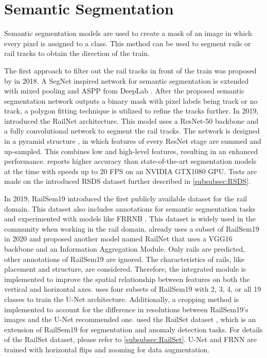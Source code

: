 \section{Semantic Segmentation}
\label{sec:SemanticSegmentation}

Semantic segmentation models are used to create a mask of an image in which every pixel is assigned to a class.
This method can be used to segment rails or rail tracks to obtain the direction of the train.

The first approach to filter out the rail tracks in front of the train was proposed by \cite{firstRailSegmentation2018} in 2018.
A SegNet \cite{SegNet2017} inspired network for semantic segmentation is extended with mixed pooling \cite{mixedPooling2014} and \ac{ASPP} from DeepLab \cite{deepLab2018}.
After the proposed semantic segmentation network outputs a binary mask with pixel labels being track or no track, a polygon fitting technique is utilized to refine the tracks further.
In 2019, \cite{railNet2019} introduced the RailNet architecture.
This model uses a ResNet-50 \cite{ResNet} backbone and a fully convolutional network \cite{FullyConvolutionalNetworks2015} to segment the rail tracks.
The network is designed in a pyramid structure \cite{FPN2017_two_stage-detector}, in which features of every ResNet stage are summed and up-sampled.
This combines low and high-level features, resulting in an enhanced performance.
\cite{railNet2019} reports higher accuracy than state-of-the-art segmentation models at the time with speeds up to 20 \ac{FPS} on an NVIDIA GTX1080 GPU.
Tests are made on the introduced \ac{RSDS} dataset further described in \autoref{subsubsec:RSDS}.

In 2019, RailSem19 \cite{railsem19dataset} introduced the first publicly available dataset for the rail domain.
This dataset also includes annotations for semantic segmentation tasks and experimented with models like FRRNB \cite{FRRNBModel2017}.
This dataset is widely used in the community when working in the rail domain.
\cite{RailNet2020} already uses a subset of RailSem19 in 2020 and proposed another model named RailNet that uses a VGG16 \cite{VGGNet2015} backbone and an Information Aggregation Module.
Only rails are predicted, other annotations of RailSem19 are ignored.
The characteristics of rails, like placement and structure, are considered.
Therefore, the integrated module is implemented to improve the spatial relationship between features on both the vertical and horizontal axes.
\cite{automatedSemSeg2022} uses four subsets of RailSem19 with 2, 3, 4, or all 19 classes to train the U-Net \cite{uNet2015} architecture.
Additionally, a cropping method is implemented to account for the difference in resolutions between RailSem19's images and the U-Net recommended one.
\cite{hadded2022application} used the RailSet dataset \cite{railSet2022}, which is an extension of RailSem19 for segmentation and anomaly detection tasks.
For details of the RailSet dataset, please refer to \autoref{subsubsec:RailSet}.
U-Net \cite{uNet2015} and FRNN \cite{FRRNBModel2017} are trained with horizontal flips and zooming for data augmentation.

